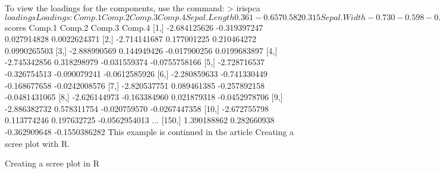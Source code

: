 To view the loadings for the components, use the command:
 > irispca$loadings Loadings:
             Comp.1 Comp.2 Comp.3 Comp.4
Sepal.Length  0.361 -0.657  0.582  0.315
Sepal.Width         -0.730 -0.598 -0.320
Petal.Length  0.857  0.173        -0.480
Petal.Width   0.358        -0.546  0.754

               Comp.1 Comp.2 Comp.3 Comp.4
SS loadings      1.00   1.00   1.00   1.00
Proportion Var   0.25   0.25   0.25   0.25
Cumulative Var   0.25   0.50   0.75   1.00 
To view the scores for each observation, use the command:
 > irispca$scores              Comp.1       Comp.2       Comp.3        Comp.4
  [1,] -2.684125626 -0.319397247  0.027914828  0.0022624371
  [2,] -2.714141687  0.177001225  0.210464272  0.0990265503
  [3,] -2.888990569  0.144949426 -0.017900256  0.0199683897
  [4,] -2.745342856  0.318298979 -0.031559374 -0.0755758166
  [5,] -2.728716537 -0.326754513 -0.090079241 -0.0612585926
  [6,] -2.280859633 -0.741330449 -0.168677658 -0.0242008576
  [7,] -2.820537751  0.089461385 -0.257892158 -0.0481431065
  [8,] -2.626144973 -0.163384960  0.021879318 -0.0452978706
  [9,] -2.886382732  0.578311754 -0.020759570 -0.0267447358
 [10,] -2.672755798  0.113774246  0.197632725 -0.0562954013
...
[150,]  1.390188862  0.282660938 -0.362909648 -0.1550386282 
This example is continued in the article Creating a scree plot with R.




Creating a scree plot in R 






